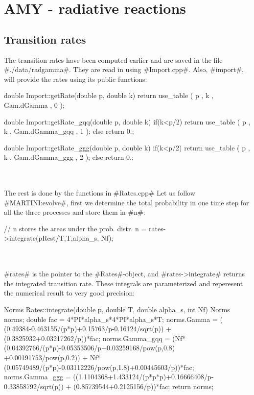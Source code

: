 \chapter{AMY - radiative reactions}
\label{radiative}
\section{Transition rates}
 The transition rates have been computed earlier and are saved in the
 file #./data/radgamma#. They are read in using #Import.cpp#. Also,
 #import#, will provide the rates using its public functions:\\

\begin{boxedverbatim}
double Import::getRate(double p, double k)
{
  return use_table ( p , k , Gam.dGamma , 0 );
}

double Import::getRate_gqq(double p, double k)
{
  if(k<p/2) return use_table ( p , k , Gam.dGamma_gqq , 1 );
  else return 0.;
}

double Import::getRate_ggg(double p, double k)
{
  if(k<p/2) return use_table ( p , k , Gam.dGamma_ggg , 2 );
  else return 0.;
}
\end{boxedverbatim}\\

~\\
The rest is done by the functions in #Rates.cpp#
Let us follow #MARTINI:evolve#, first we determine the total
probability in one time step for all the three processes and store
them in #n#:\\

\begin{boxedverbatim}
 // n stores the areas under the prob. distr.
n = rates->integrate(pRest/T,T,alpha_s, Nf); 
\end{boxedverbatim}\\

~\\
#rates# is the pointer to the #Rates#-object, and #rates->integrate#
returns the integrated transition rate. These integrals are parameterized and reperesent the
numerical result to very good precision:\\

\begin{boxedverbatim}
Norms Rates::integrate(double p, double T, double alpha_s, int Nf)
{
  Norms norms;
  double fac = 4*PI*alpha_s*4*PI*alpha_s*T;
  norms.Gamma = ( (0.49384-0.463155/(p*p)+0.15763/p-0.16124/sqrt(p)) 
                 +(0.3825932+0.03217262/p))*fac;
  norms.Gamma_gqq = (Nf*(0.04392766/(p*p)-0.05353506/p+0.03259168/pow(p,0.8)
                     +0.00191753/pow(p,0.2))
                    + Nf*(0.05749489/(p*p)-0.03112226/pow(p,1.8)+0.00445603/p))*fac;
  norms.Gamma_ggg = ((1.1104368+1.433124/(p*p*p)+0.16666408/p-0.33858792/sqrt(p)) 
                      + (0.85739544+0.2125156/p))*fac;
  return norms;
}
\end{boxedverbatim}\\

